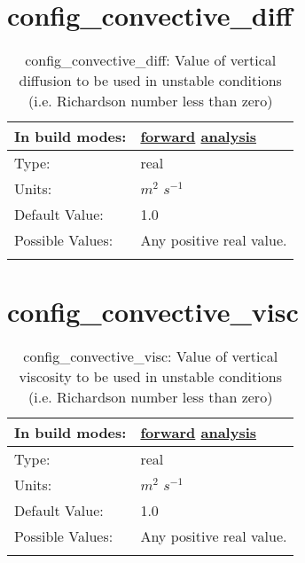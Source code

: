 \section[config\_convective\_diff]{config\_convective\_diff}
\label{sec:nm_sec_config_convective_diff}
\begin{center}
\begin{longtable}{| p{2.0in} || p{4.0in} |}
    \hline
    In build modes: & \hyperref[subsec:forward_nm_tab_vmix]{forward} \hyperref[subsec:analysis_nm_tab_vmix]{analysis} \\
    \hline
    Type: & real \\
    \hline
    Units: & $m^2$ $s^{-1}$ \\
    \hline
    Default Value: & 1.0 \\
    \hline
    Possible Values: & Any positive real value. \\
    \hline
    \caption{config\_convective\_diff: Value of vertical diffusion to be used in unstable conditions (i.e. Richardson number less than zero)}
\end{longtable}
\end{center}
\section[config\_convective\_visc]{config\_convective\_visc}
\label{sec:nm_sec_config_convective_visc}
\begin{center}
\begin{longtable}{| p{2.0in} || p{4.0in} |}
    \hline
    In build modes: & \hyperref[subsec:forward_nm_tab_vmix]{forward} \hyperref[subsec:analysis_nm_tab_vmix]{analysis} \\
    \hline
    Type: & real \\
    \hline
    Units: & $m^2$ $s^{-1}$ \\
    \hline
    Default Value: & 1.0 \\
    \hline
    Possible Values: & Any positive real value. \\
    \hline
    \caption{config\_convective\_visc: Value of vertical viscosity to be used in unstable conditions (i.e. Richardson number less than zero)}
\end{longtable}
\end{center}
